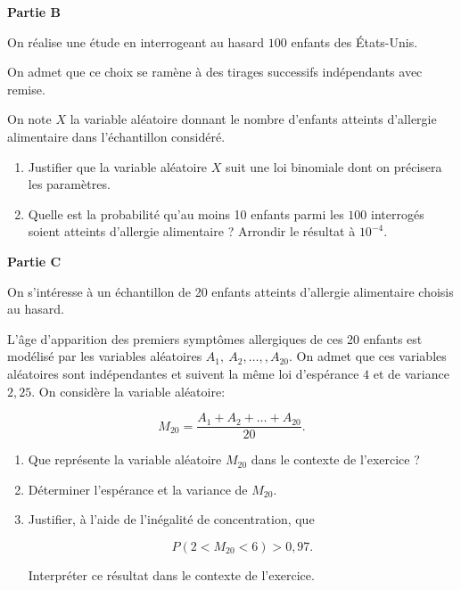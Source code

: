\documentclass[10pt]{article}
\begin{document}
\medskip

\textbf{Partie B}

\medskip

On réalise une étude en interrogeant au hasard $100$ enfants des États-Unis.

On admet que ce choix se ramène à des tirages successifs indépendants avec remise.

On note $X$ la variable aléatoire donnant le nombre d'enfants atteints d'allergie alimentaire dans l'échantillon considéré.

\medskip

\begin{enumerate}
\item Justifier que la variable aléatoire $X$ suit une loi binomiale dont on précisera les paramètres.
\item Quelle est la probabilité qu'au moins 10 enfants parmi les $100$ interrogés soient atteints d'allergie alimentaire ? Arrondir le résultat à $10^{-4}$.
\end{enumerate}

\medskip

\textbf{Partie C}

\medskip

On s'intéresse à un échantillon de 20 enfants atteints d'allergie alimentaire choisis au
hasard.

\smallskip

L'âge d'apparition des premiers symptômes allergiques de ces 20 enfants est modélisé par les variables aléatoires $A_1,\: A_2,\ldots, ,A_{20}$. On admet que ces variables aléatoires sont indépendantes et suivent la même loi d'espérance $4$ et de variance $2,25$.
On considère la variable aléatoire:

\[M_{20} = \dfrac{A_1 + A_2 + \ldots + A_{20}}{20}.\]


\begin{enumerate}
\item Que représente la variable aléatoire $M_{20}$ dans le contexte de l'exercice ?
\item Déterminer l'espérance et la variance de $M_{20}$.
\item Justifier, à l'aide de l'inégalité de concentration, que

\[P(2 < M_{20} < 6) > 0,97.\]

Interpréter ce résultat dans le contexte de l'exercice.
\end{enumerate}

\bigskip
\end{document}

